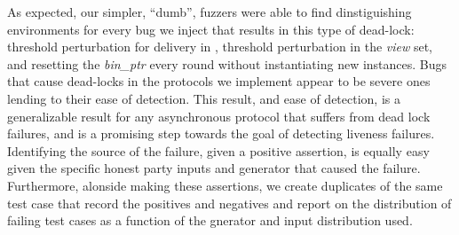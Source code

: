 
As expected, our simpler, ``dumb'', fuzzers were able to find dinstiguishing
environments for every bug we inject that results in this type of dead-lock:
threshold perturbation for delivery in , threshold perturbation
in the \emph{view} set, and resetting the \emph{bin\_ptr} every round without
instantiating new  instances.  Bugs that cause dead-locks in
the protocols we implement appear to be severe ones lending to their ease of
detection.  This result, and ease of detection, is a generalizable result for
any asynchronous protocol that suffers from dead lock failures, and is a
promising step towards the goal of detecting liveness failures.  Identifying
the source of the failure, given a positive assertion, is equally easy given
the specific honest party inputs and generator that caused the failure.
Furthermore, alonside making these assertions, we create duplicates of the same
test case that record the positives and negatives and report on the
distribution of failing test cases as a function of the gnerator and input
distribution used.

